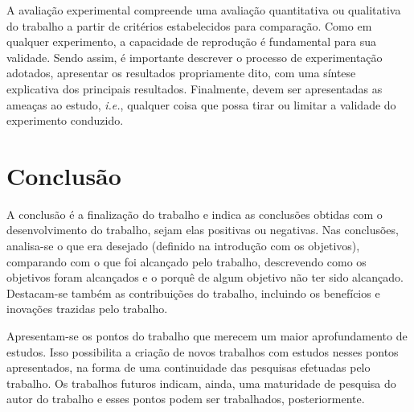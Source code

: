 \documentclass[12pt]{tcc}
\begin{document}
A avaliação experimental compreende uma avaliação quantitativa ou qualitativa do trabalho a partir de critérios estabelecidos para comparação. Como em qualquer experimento, a capacidade de reprodução é fundamental para sua validade. Sendo assim, é importante descrever o processo de experimentação adotados, apresentar os resultados propriamente dito, com uma síntese explicativa dos principais resultados. Finalmente, devem ser apresentadas as ameaças ao estudo, \emph{i.e.}, qualquer coisa que possa tirar ou limitar a validade do experimento conduzido. 

\chapter{Conclusão}
	\label{sec:conclusao}

	A conclusão é a finalização do trabalho e indica as conclusões obtidas com o desenvolvimento do trabalho, sejam elas positivas ou negativas. Nas conclusões, analisa-se o que era desejado (definido na introdução com os objetivos), comparando com o que foi alcançado pelo trabalho, descrevendo como os objetivos foram alcançados e o porquê de algum objetivo não ter sido alcançado. Destacam-se também as contribuições do trabalho, incluindo os benefícios e inovações trazidas pelo trabalho.

Apresentam-se os pontos do trabalho que merecem um maior aprofundamento de estudos. Isso possibilita a criação de novos trabalhos com estudos nesses pontos apresentados, na forma de uma continuidade das pesquisas efetuadas pelo trabalho. Os trabalhos futuros indicam, ainda, uma maturidade de pesquisa do autor do trabalho e esses pontos podem ser trabalhados, posteriormente.

\label{bibpage}
\renewcommand\bibname{Referências}

%

\label{bibfinalpage}

\label{lastpage}
\end{document}
